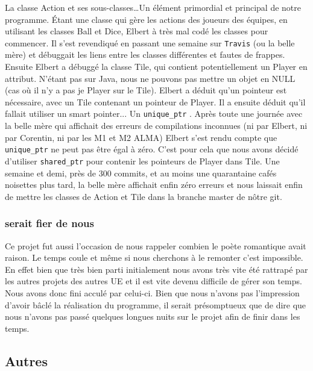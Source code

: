 \documentclass{article}
\newcommand{\info}{\texttt}
\begin{document}
        La classe Action et ses sous-classes\dots Un élément primordial et principal de notre programme. Étant une classe qui gère les actions des joueurs des équipes, en utilisant les classes Ball et Dice, Elbert à très mal codé les classes pour commencer. Il s'est revendiqué en passant une semaine sur \info{Travis} (ou la belle mère) et débuggait les liens entre les classes différentes et fautes de frappes. Ensuite Elbert a débuggé la classe Tile, qui contient potentiellement un Player en attribut. N'étant pas sur Java, nous ne pouvons pas mettre un objet en NULL (cas où il n'y a pas je Player sur le Tile). Elbert a déduit qu'un pointeur est nécessaire, avec un Tile contenant un pointeur de Player. Il a ensuite déduit qu'il fallait utiliser un smart pointer... Un \info{unique\_ptr} . Après toute une journée avec la belle mère qui affichait des erreurs de compilations inconnues (ni par Elbert, ni par Corentin, ni par les M1 et M2 ALMA) Elbert s'est rendu compte que \info{unique\_ptr} ne peut pas être égal à zéro. C'est pour cela que nous avons décidé d'utiliser \info{shared\_ptr} pour contenir les pointeurs de Player dans Tile. Une semaine et demi, près de 300 commits, et au moins une quarantaine cafés noisettes plus tard, la belle mère affichait enfin zéro erreurs et nous laissait enfin de mettre les classes de Action et Tile dans la branche master de nôtre git.
        
        \subsubsection{ serait fier de nous}
        
        Ce projet fut aussi l'occasion de nous rappeler combien le poète romantique avait raison. Le temps coule et même si nous cherchons à le remonter c'est impossible. En effet bien que très bien parti initialement nous avons très vite été rattrapé par les autres projets des autres UE et il est vite devenu difficile de gérer son temps. Nous avons donc fini acculé par celui-ci. Bien que nous n'avons pas l'impression d'avoir bâclé la réalisation du programme, il serait présomptueux que de dire que nous n'avons pas passé quelques longues nuits sur le projet afin de finir dans les temps. 
    
    \subsection{Autres}
\end{document}
